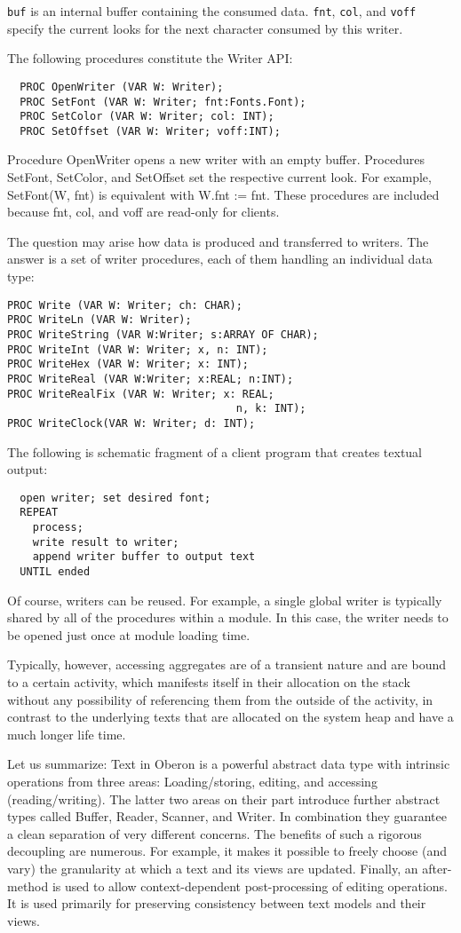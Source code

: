 \verb|buf| is an internal buffer containing the consumed data. \verb|fnt|, \verb|col|, and \verb|voff| specify the current looks for
the next character consumed by this writer.

The following procedures constitute the Writer API:
\begin{verbatim}
  PROC OpenWriter (VAR W: Writer);
  PROC SetFont (VAR W: Writer; fnt:Fonts.Font);
  PROC SetColor (VAR W: Writer; col: INT);
  PROC SetOffset (VAR W: Writer; voff:INT);
\end{verbatim}

Procedure OpenWriter opens a new writer with an empty buffer. Procedures SetFont, SetColor, and
SetOffset set the respective current look. For example, SetFont(W, fnt) is equivalent with W.fnt :=
fnt. These procedures are included because fnt, col, and voff are read-only for clients.

The question may arise how data is produced and transferred to writers. The answer is a set of
writer procedures, each of them handling an individual data type:
\begin{verbatim}
PROC Write (VAR W: Writer; ch: CHAR);
PROC WriteLn (VAR W: Writer);
PROC WriteString (VAR W:Writer; s:ARRAY OF CHAR);
PROC WriteInt (VAR W: Writer; x, n: INT);
PROC WriteHex (VAR W: Writer; x: INT);
PROC WriteReal (VAR W:Writer; x:REAL; n:INT);
PROC WriteRealFix (VAR W: Writer; x: REAL;
                                    n, k: INT);
PROC WriteClock(VAR W: Writer; d: INT);
\end{verbatim}

The following is schematic fragment of a client program that creates textual output:
\begin{verbatim}
  open writer; set desired font;
  REPEAT
    process;
    write result to writer;
    append writer buffer to output text
  UNTIL ended
\end{verbatim}
Of course, writers can be reused. For example, a single global writer is typically shared by all of the
procedures within a module. In this case, the writer needs to be opened just once at module loading
time.

Typically, however, accessing aggregates are of a transient nature and are bound to a certain
activity, which manifests itself in their allocation on the stack without any possibility of referencing
them from the outside of the activity, in contrast to the underlying texts that are allocated on the
system heap and have a much longer life time.

Let us summarize: Text in Oberon is a powerful abstract data type with intrinsic operations from
three areas: Loading/storing, editing, and accessing (reading/writing). The latter two areas on their
part introduce further abstract types called Buffer, Reader, Scanner, and Writer. In combination
they guarantee a clean separation of very different concerns. The benefits of such a rigorous
decoupling are numerous. For example, it makes it possible to freely choose (and vary) the
granularity at which a text and its views are updated. Finally, an after-method is used to allow
context-dependent post-processing of editing operations. It is used primarily for preserving
consistency between text models and their views.
